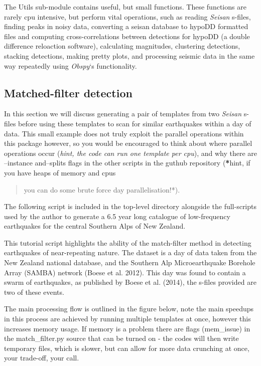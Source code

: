 \documentclass[a4paper,10pt,english]{sphinxmanual}
\begin{document}
The Utils sub-module contains useful, but small functions.  These functions are
rarely cpu intensive, but perform vital operations, such as reading \emph{Seisan} s-files,
finding peaks in noisy data, converting a seisan database to hypoDD formatted
files and computing cross-correlations between detections for hypoDD (a double
difference reloaction software), calculating magnitudes, clustering detections,
stacking detections, making pretty plots, and processing seismic data in the
same way repeatedly using \emph{Obspy}`s functionality.


\subsection{Matched-filter detection}
\label{tutorial:matched-filter-detection}
In this section we will discuss generating a pair of templates from two
\emph{Seisan} s-files before using these templates to scan for similar earthquakes
within a day of data.  This small example does not truly exploit the parallel
operations within this package however, so you would be encouraged to think
about where parallel operations occur (\emph{hint, the code can run one template
per cpu}), and why there are --instance and--splits flags in the other
scripts in the guthub repository ({\color{red}\bfseries{}*}hint, if you have heaps of memory and cpus
\begin{quote}

you can do some brute force day parallelisation!*).
\end{quote}

The following script is included in the top-level directory alongside the full-scripts
used by the author to generate a 6.5 year long catalogue of low-frequency earthquakes
for the central Southern Alps of New Zealand.

This tutorial script highlights the ability of the match-filter method in detecting
earthquakes of near-repeating nature.  The dataset is a day of data taken from the
New Zealand national database, and the Southern Alp Microearthquake Borehole Array
(SAMBA) network (Boese et al. 2012).  This day was found to contain a swarm of
earthquakes, as published by Boese et al. (2014), the s-files provided are two
of these events.

The main processing flow is outlined in the figure below, note the main speedups
in this process are achieved by running multiple templates at once, however this
increases memory usage.  If memory is a problem there are flags (mem\_issue) in the
match\_filter.py source that can be turned on - the codes will then write temporary
files, which is slower, but can allow for more data crunching at once, your trade-off,
your call.
\end{document}
